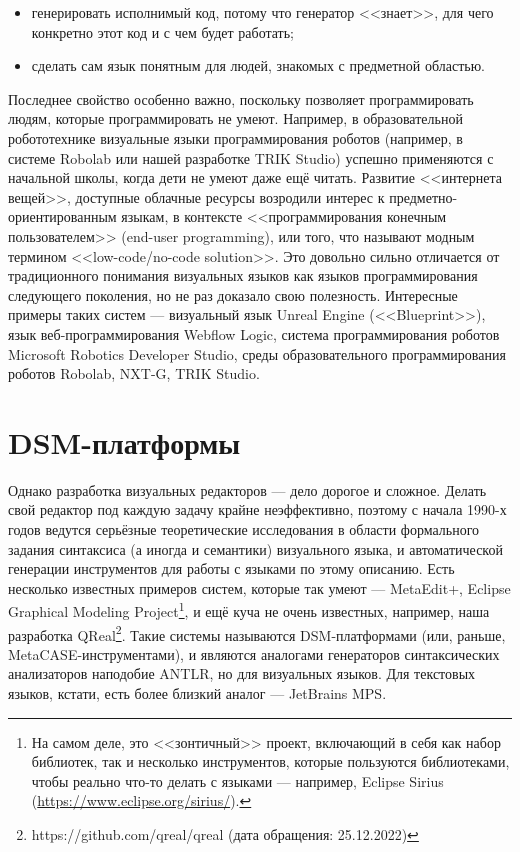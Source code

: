\documentclass{text-style}
\begin{document}
\begin{itemize}
    \item генерировать исполнимый код, потому что генератор <<знает>>, для чего конкретно этот код и с чем будет работать;
    \item сделать сам язык понятным для людей, знакомых с предметной областью.
\end{itemize}

Последнее свойство особенно важно, поскольку позволяет программировать людям, которые программировать не умеют. Например, в образовательной робототехнике визуальные языки программирования роботов (например, в системе Robolab или нашей разработке TRIK Studio) успешно применяются с начальной школы, когда дети не умеют даже ещё читать. Развитие <<интернета вещей>>, доступные облачные ресурсы возродили интерес к предметно-ориентированным языкам, в контексте <<программирования конечным пользователем>> (end-user programming), или того, что называют модным термином <<low-code/no-code solution>>. Это довольно сильно отличается от традиционного понимания визуальных языков как языков программирования следующего поколения, но не раз доказало свою полезность. Интересные примеры таких систем --- визуальный язык Unreal Engine (<<Blueprint>>), язык веб-программирования Webflow Logic, система программирования роботов Microsoft Robotics Developer Studio, среды образовательного программирования роботов Robolab, NXT-G, TRIK Studio.


\section{DSM-платформы}

Однако разработка визуальных редакторов --- дело дорогое и сложное. Делать свой редактор под каждую задачу крайне неэффективно, поэтому с начала 1990-х годов ведутся серьёзные теоретические исследования в области формального задания синтаксиса (а иногда и семантики) визуального языка, и автоматической генерации инструментов для работы с языками по этому описанию. Есть несколько известных примеров систем, которые так умеют --- MetaEdit+, Eclipse Graphical Modeling Project\footnote{На самом деле, это <<зонтичный>> проект, включающий в себя как набор библиотек, так и несколько инструментов, которые пользуются библиотеками, чтобы реально что-то делать с языками --- например, Eclipse Sirius (\url{https://www.eclipse.org/sirius/}).}, и ещё куча не очень известных, например, наша разработка QReal\footnote{https://github.com/qreal/qreal (дата обращения: 25.12.2022)}. Такие системы называются DSM-платформами (или, раньше, MetaCASE-инструментами), и являются аналогами генераторов синтаксических анализаторов наподобие ANTLR, но для визуальных языков. Для текстовых языков, кстати, есть более близкий аналог --- JetBrains MPS.
\end{document}
